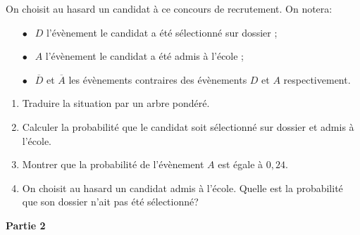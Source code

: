 \documentclass[10pt,a4paper,french]{article}
\begin{document}
On choisit au hasard un candidat à ce concours de recrutement. On notera:

\setlength\parindent{1cm}
\begin{itemize}
\item[$\bullet~~$] $D$ l'évènement \og le candidat a été sélectionné sur dossier \fg{} ;
\item[$\bullet~~$] $A$ l'évènement \og le candidat a été admis à l'école \fg{} ;
\item[$\bullet~~$] $\overline{D}$ et $\overline{A}$ les évènements contraires des évènements $D$ et $A$ respectivement.
\end{itemize}
\setlength\parindent{0cm}

\medskip

\begin{enumerate}
\item Traduire la situation par un arbre pondéré.
\item Calculer la probabilité que le candidat soit sélectionné sur dossier et admis à l'école.
\item Montrer que la probabilité de l'évènement  $A$ est égale à $0,24$.
\item On choisit au hasard un candidat admis à l'école. Quelle est la probabilité que son dossier n'ait pas été sélectionné?
\end{enumerate}

\bigskip

\textbf{Partie 2}

\medskip
\end{document}

